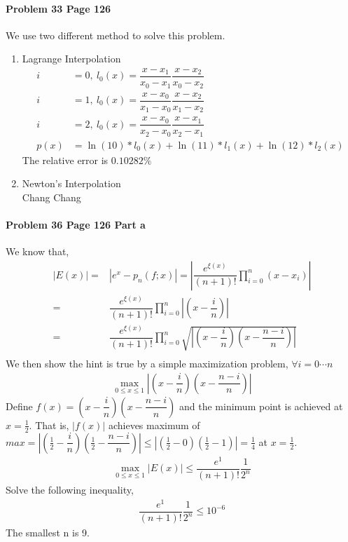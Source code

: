 \documentclass[paper=a4, fontsize=11pt]{scrartcl} %
\numberwithin{equation}{section} %
\numberwithin{figure}{section} %
\numberwithin{table}{section} %
\begin{document}
\paragraph{\textbf{Problem 33 Page 126}} 
We use two different method to solve this problem.
\begin{enumerate}
	\item Lagrange Interpolation\\
		\begin{align*}
			i&=0,~l_0(x)=\dfrac{x-x_1}{x_0-x_1}\dfrac{x-x_2}{x_0-x_2}\\
			i&=1,~l_0(x)=\dfrac{x-x_0}{x_1-x_0}\dfrac{x-x_2}{x_1-x_2}\\
			i&=2,~l_0(x)=\dfrac{x-x_0}{x_2-x_0}\dfrac{x-x_1}{x_2-x_1}\\
			p(x)&=\ln(10)*l_0(x)	+ \ln(11)*l_1(x)+\ln(12)*l_2(x)
		\end{align*}
		The relative error is $ 0.10282\% $
	
	\item Newton's Interpolation\\
	Chang Chang
\end{enumerate}
\newpage

\paragraph{\textbf{Problem 36 Page 126 Part a}} 

We know that,
\begin{align*}
	|E(x)| = &|e^x-p_n(f;x)| = |\dfrac{e^{\xi(x)}}{(n+1)!}\prod_{i=0}^{n}(x-x_i)|\\
		 = &\dfrac{e^{\xi(x)}}{(n+1)!}\prod_{i=0}^{n}|(x-\dfrac{i}{n})|\\
 		 = &\dfrac{e^{\xi(x)}}{(n+1)!}\prod_{i=0}^{n}\sqrt{|(x-\dfrac{i}{n})(x-\dfrac{n-i}{n})|}\\
\end{align*}
We then show the hint is true by a simple maximization problem, $ \forall i=0\cdots n $
\begin{align*}
	\max_{0\leq x\leq 1} |(x-\dfrac{i}{n})(x-\dfrac{n-i}{n})|	
\end{align*}
Define $ f(x)=(x-\dfrac{i}{n})(x-\dfrac{n-i}{n}) $ and the minimum point is achieved at $ x=\frac{1}{2} $. That is, $ |f(x)| $ achieves maximum of $ max = |(\frac{1}{2}-\dfrac{i}{n})(\frac{1}{2}-\dfrac{n-i}{n})|\leq |(\frac{1}{2}-0)(\frac{1}{2}-1)|=\frac{1}{4} $ at $ x=\frac{1}{2} $.
\begin{align*}
	\max_{0\leq x\leq 1}|E(x)|\leq \dfrac{e^{1}}{(n+1)!}\dfrac{1}{2^n}
\end{align*}
Solve the following inequality,
\begin{align*}
	\dfrac{e^{1}}{(n+1)!}\dfrac{1}{2^n}\leq 10^{-6}
\end{align*}
The smallest n is 9.
\end{document}
